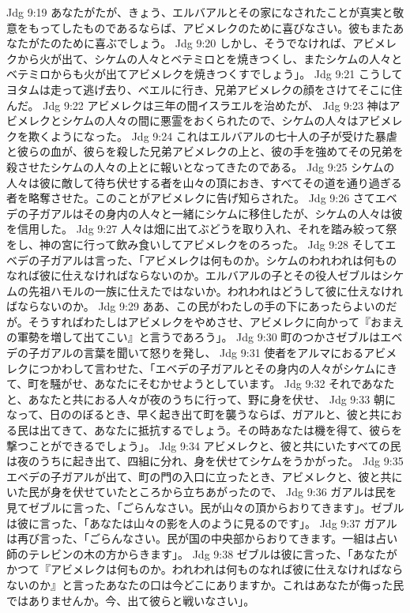 Jdg 9:19  あなたがたが、きょう、エルバアルとその家になされたことが真実と敬意をもってしたものであるならば、アビメレクのために喜びなさい。彼もまたあなたがたのために喜ぶでしょう。
Jdg 9:20  しかし、そうでなければ、アビメレクから火が出て、シケムの人々とベテミロとを焼きつくし、またシケムの人々とベテミロからも火が出てアビメレクを焼きつくすでしょう」。
Jdg 9:21  こうしてヨタムは走って逃げ去り、ベエルに行き、兄弟アビメレクの顔をさけてそこに住んだ。
Jdg 9:22  アビメレクは三年の間イスラエルを治めたが、
Jdg 9:23  神はアビメレクとシケムの人々の間に悪霊をおくられたので、シケムの人々はアビメレクを欺くようになった。
Jdg 9:24  これはエルバアルの七十人の子が受けた暴虐と彼らの血が、彼らを殺した兄弟アビメレクの上と、彼の手を強めてその兄弟を殺させたシケムの人々の上とに報いとなってきたのである。
Jdg 9:25  シケムの人々は彼に敵して待ち伏せする者を山々の頂におき、すべてその道を通り過ぎる者を略奪させた。このことがアビメレクに告げ知らされた。
Jdg 9:26  さてエベデの子ガアルはその身内の人々と一緒にシケムに移住したが、シケムの人々は彼を信用した。
Jdg 9:27  人々は畑に出てぶどうを取り入れ、それを踏み絞って祭をし、神の宮に行って飲み食いしてアビメレクをのろった。
Jdg 9:28  そしてエベデの子ガアルは言った、「アビメレクは何ものか。シケムのわれわれは何ものなれば彼に仕えなければならないのか。エルバアルの子とその役人ゼブルはシケムの先祖ハモルの一族に仕えたではないか。われわれはどうして彼に仕えなければならないのか。
Jdg 9:29  ああ、この民がわたしの手の下にあったらよいのだが。そうすればわたしはアビメレクをやめさせ、アビメレクに向かって『おまえの軍勢を増して出てこい』と言うであろう」。
Jdg 9:30  町のつかさゼブルはエベデの子ガアルの言葉を聞いて怒りを発し、
Jdg 9:31  使者をアルマにおるアビメレクにつかわして言わせた、「エベデの子ガアルとその身内の人々がシケムにきて、町を騒がせ、あなたにそむかせようとしています。
Jdg 9:32  それであなたと、あなたと共におる人々が夜のうちに行って、野に身を伏せ、
Jdg 9:33  朝になって、日ののぼるとき、早く起き出て町を襲うならば、ガアルと、彼と共におる民は出てきて、あなたに抵抗するでしょう。その時あなたは機を得て、彼らを撃つことができるでしょう」。
Jdg 9:34  アビメレクと、彼と共にいたすべての民は夜のうちに起き出て、四組に分れ、身を伏せてシケムをうかがった。
Jdg 9:35  エベデの子ガアルが出て、町の門の入口に立ったとき、アビメレクと、彼と共にいた民が身を伏せていたところから立ちあがったので、
Jdg 9:36  ガアルは民を見てゼブルに言った、「ごらんなさい。民が山々の頂からおりてきます」。ゼブルは彼に言った、「あなたは山々の影を人のように見るのです」。
Jdg 9:37  ガアルは再び言った、「ごらんなさい。民が国の中央部からおりてきます。一組は占い師のテレビンの木の方からきます」。
Jdg 9:38  ゼブルは彼に言った、「あなたがかつて『アビメレクは何ものか。われわれは何ものなれば彼に仕えなければならないのか』と言ったあなたの口は今どこにありますか。これはあなたが侮った民ではありませんか。今、出て彼らと戦いなさい」。

